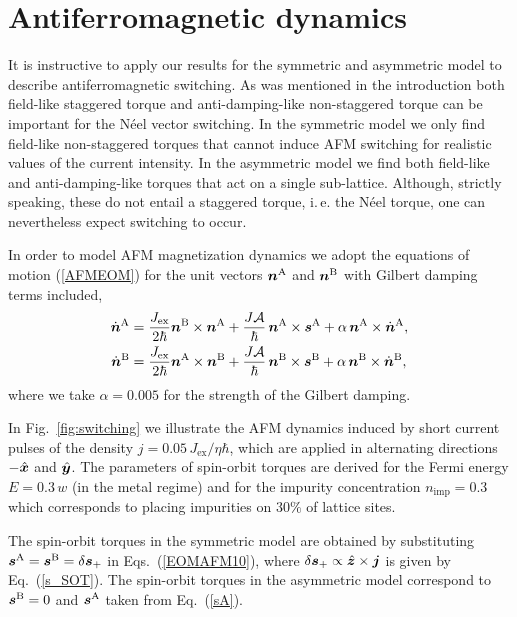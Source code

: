 \section{Antiferromagnetic dynamics}

It is instructive to apply our results for the symmetric and asymmetric model to describe antiferromagnetic switching. As was mentioned in the introduction both field-like staggered torque and anti-damping-like non-staggered torque can be important for the N\'eel vector switching. In the symmetric model we only find field-like non-staggered torques that cannot induce AFM switching for realistic values of the current intensity. In the asymmetric model we find both field-like and anti-damping-like torques that act on a single sub-lattice. Although, strictly speaking, these do not entail a staggered torque, i.\,e. the N\'eel torque, one can nevertheless expect switching to occur. 

In order to model AFM magnetization dynamics we adopt the equations of motion (\ref{AFMEOM}) for the unit vectors $\boldsymbol{n}^\text{A}$ and $\boldsymbol{n}^\text{B}$  with Gilbert damping terms included,
\beml
\label{EOMAFM10}
\begin{align}
\dot{\boldsymbol{n}}^\text{A} &= \frac{J_\text{ex}}{2\hbar}\boldsymbol{n}^\text{B}\times \boldsymbol{n}^\text{A}+ \frac{J\mathcal{A}}{\hbar}\, \boldsymbol{n}^\text{A}\times \boldsymbol{s}^\text{A} +\alpha\, \boldsymbol{n}^\text{A}\times \dot{\boldsymbol{n}}^\text{A},\\
\dot{\boldsymbol{n}}^\text{B}&= \frac{J_\text{ex}}{2\hbar} \boldsymbol{n}^\text{A}\times \boldsymbol{n}^\text{B}+ \frac{J\mathcal{A}}{\hbar}\, \boldsymbol{n}^\text{B}\times \boldsymbol{s}^\text{B}+\alpha\, \boldsymbol{n}^\text{B}\times \dot{\boldsymbol{n}}^\text{B},
\end{align}
\eml
where we take $\alpha=0.005$ for the strength of the Gilbert damping.  

In Fig.~\ref{fig:switching} we illustrate the AFM dynamics induced by short current pulses of the density $j=0.05\,J_\text{ex}/\eta\hbar$, which are applied in alternating directions $-\hat{\boldsymbol{x}}$ and $\hat{\boldsymbol{y}}$. The parameters of spin-orbit torques are derived for the Fermi energy $E =0.3\,w$ (in the metal regime) and for the impurity concentration $n_\text{imp}=0.3$ which corresponds to placing impurities on $30\%$ of lattice sites.   

The spin-orbit torques in the symmetric model are obtained by substituting $\boldsymbol{s}^\text{A}=\boldsymbol{s}^\text{B} = \delta\boldsymbol{s}_+$ in Eqs.~(\ref{EOMAFM10}), where $\delta\boldsymbol{s}_+ \propto \hat{\boldsymbol{z}}\times\boldsymbol{j}$ is given by Eq.~(\ref{s_SOT}). The spin-orbit torques in the asymmetric model correspond to $\boldsymbol{s}^\text{B}=0$ and $\boldsymbol{s}^\text{A}$ taken from Eq.~(\ref{sA}).
 

